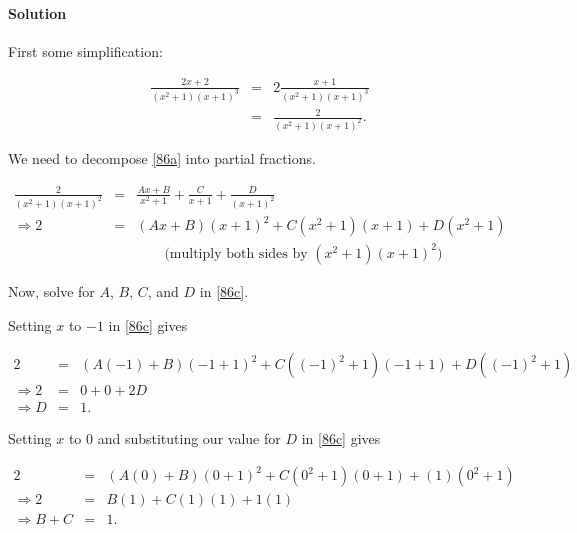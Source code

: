 
\paragraph{Solution}

First some simplification:

\begin{eqnarray}
	\frac{2x+2}{\left(x^2+1\right)\left(x+1\right)^3}&=&2\frac{x+1}{\left(x^2+1\right)\left(x+1\right)^3}\nonumber\\
	&=&\frac{2}{\left(x^2+1\right)\left(x+1\right)^2}.\label{86a}
\end{eqnarray}

We need to decompose \ref{86a} into partial fractions.

\begin{eqnarray}
	\frac{2}{\left(x^2+1\right)\left(x+1\right)^2}&=&\frac{Ax+B}{x^2+1}+\frac{C}{x+1}+\frac{D}{\left(x+1\right)^2}\label{86b}\\
	\Rightarrow2&=&\left(Ax+B\right)\left(x+1\right)^2+C\left(x^2+1\right)\left(x+1\right)+D\left(x^2+1\right)\label{86c}\\
    &&\qquad\mbox{(multiply both sides by }\left(x^2+1\right)\left(x+1\right)^2\mbox{)}\nonumber
\end{eqnarray}

Now, solve for $A$, $B$, $C$, and $D$ in \ref{86c}.

Setting $x$ to $-1$ in \ref{86c} gives

\begin{eqnarray*}
    2&=&\left(A\left(-1\right)+B\right)\left(-1+1\right)^2+C\left(\left(-1\right)^2+1\right)\left(-1+1\right)+D\left(\left(-1\right)^2+1\right)\\
    \Rightarrow2&=&0+0+2D\\
    \Rightarrow D&=&1.
\end{eqnarray*}

Setting $x$ to $0$ and substituting our value for $D$ in \ref{86c} gives

\begin{eqnarray}
	2&=&\left(A\left(0\right)+B\right)\left(0+1\right)^2+C\left(0^2+1\right)\left(0+1\right)+\left(1\right)\left(0^2+1\right)\nonumber\\
    \Rightarrow2&=&B\left(1\right)+C\left(1\right)\left(1\right)+1\left(1\right)\nonumber\\
    \Rightarrow B+C&=&1.\label{86d}
\end{eqnarray}

